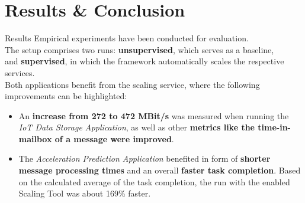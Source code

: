 \documentclass[10pt]{beamer}
\begin{document}
\section{Results \& Conclusion}
\begin{frame}{Results}
	Empirical experiments have been conducted for evaluation.\\
    The setup comprises two runs: \textbf{unsupervised}, which serves as a baseline,\\
    and \textbf{supervised}, in which the framework automatically scales the respective services.\\
	Both applications benefit from the scaling service, where the following improvements can be highlighted:\\
    \hfill

	\begin{itemize}
		\item An \textbf{increase from 272 to 472 MBit/s} was measured when running the \textit{IoT Data Storage Application}, as well as other \textbf{metrics like the time-in-mailbox of a message were improved}.
		\item The \textit{Acceleration Prediction Application} benefited in form of \textbf{shorter message processing times} and an overall \textbf{faster task completion}.
              Based on the calculated average of the task completion, the run with the enabled Scaling Tool was about 169\% faster.
	\end{itemize}
\end{frame}

{ %
    \begin{frame}[plain]
     \end{frame}
}
\end{document}
